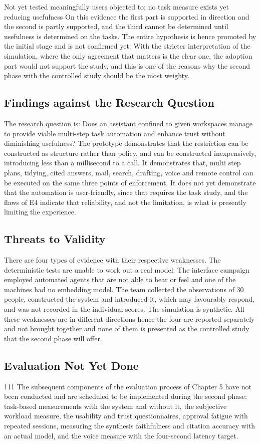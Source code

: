 \documentclass{FastFyp}
\begin{document}
Not yet tested meaningfully users objected to; no task measure exists yet reducing usefulness On this evidence the first part is supported in direction and the second is partly supported, and the third cannot be determined until usefulness is determined on the tasks. The entire hypothesis is hence promoted by the initial stage and is not confirmed yet. With the stricter interpretation of the simulation, where the only agreement that matters is the clear one, the adoption part would not support the study, and this is one of the reasons why the second phase with the controlled study should be the most weighty.

\subsection{Findings against the Research Question}
The research question is: Does an assistant confined to given workspaces manage to provide viable multi-step task automation and enhance trust without diminishing usefulness? The prototype demonstrates that the restriction can be constructed as structure rather than policy, and can be constructed inexpensively, introducing less than a millisecond to a call. It demonstrates that, multi step plans, tidying, cited answers, mail, search, drafting, voice and remote control can be executed on the same three points of enforcement. It does not yet demonstrate that the automation is user-friendly, since that requires the task study, and the flaws of E4 indicate that reliability, and not the limitation, is what is presently limiting the experience.

\subsection{Threats to Validity}
There are four types of evidence with their respective weaknesses. The deterministic tests are unable to work out a real model. The interface campaign employed automated agents that are not able to hear or feel and one of the machines had no embedding model. The team collected the observations of 30 people, constructed the system and introduced it, which may favourably respond, and was not recorded in the individual scores. The simulation is synthetic. All these weaknesses are in different directions hence the four are reported separately and not brought together and none of them is presented as the controlled study that the second phase will offer.

\subsection{Evaluation Not Yet Done}
111 The subsequent components of the evaluation process of Chapter 5 have not been conducted and are scheduled to be implemented during the second phase: task-based measurements with the system and without it, the subjective workload measure, the usability and trust questionnaires, approval fatigue with repeated sessions, measuring the synthesis faithfulness and citation accuracy with an actual model, and the voice measure with the four-second latency target.
\end{document}
